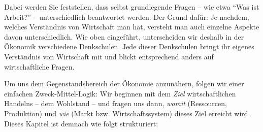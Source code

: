 \documentclass[
  nswissgerman,
  a4paper,
  DIV=11,
  numbers=noendperiod,
  oneside,
  openany]{scrreprt}
\begin{document}
Dabei werden Sie feststellen, dass selbst grundlegende Fragen -- wie
etwa ``Was ist Arbeit?'' -- unterschiedlich beantwortet werden. Der
Grund dafür: Je nachdem, welches Verständnis von Wirtschaft man hat,
versteht man auch einzelne Aspekte davon unterschiedlich. Wie oben
eingeführt, unterscheiden wir deshalb in der Ökonomik verschiedene
Denkschulen. Jede dieser Denkschulen bringt ihr eigenes Verständnis von
Wirtschaft mit und blickt entsprechend anders auf wirtschaftliche
Fragen.

Um uns dem Gegenstandsbereich der Ökonomie anzunähern, folgen wir einer
einfachen Zweck-Mittel-Logik: Wir beginnen mit dem \emph{Ziel}
wirtschaftlichen Handelns -- dem Wohlstand -- und fragen uns dann,
\emph{womit} (Ressourcen, Produktion) und \emph{wie} (Markt bzw.
Wirtschaftssystem) dieses Ziel erreicht wird. Dieses Kapitel ist demnach
wie folgt strukturiert:
\end{document}
